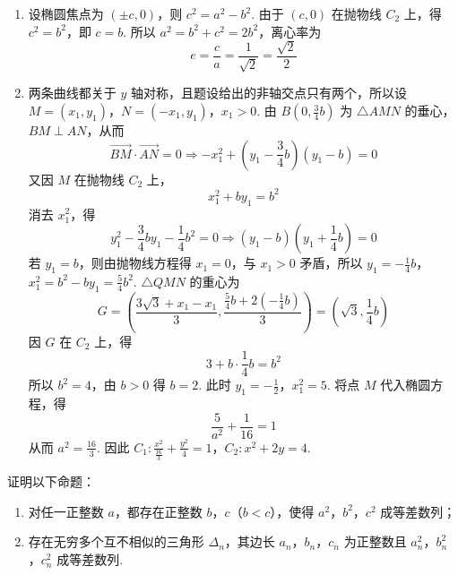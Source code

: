 \begin{solution}
\begin{enumerate}
\item 设椭圆焦点为 \((\pm c,0)\)，则 \(c^2=a^2-b^2\). 由于 \((c,0)\) 在抛物线 \(C_2\) 上，得 \(c^2=b^2\)，即 \(c=b\). 所以 \(a^2=b^2+c^2=2b^2\)，离心率为
\[
e=\frac ca=\frac1{\sqrt2}=\frac{\sqrt2}{2}
\]
\item 两条曲线都关于 \(y\) 轴对称，且题设给出的非轴交点只有两个，所以设
\(M=(x_1,y_1)\)，\(N=(-x_1,y_1)\)，\(x_1>0\).
由 \(B\!\left(0,\frac34b\right)\) 为 \(\triangle AMN\) 的垂心，\(BM\perp AN\)，从而
\[
\overrightarrow{BM}\cdot\overrightarrow{AN}=0
\Longrightarrow -x_1^2+\left(y_1-\frac34b\right)(y_1-b)=0
\]
又因 \(M\) 在抛物线 \(C_2\) 上，
\[
x_1^2+by_1=b^2
\]
消去 \(x_1^2\)，得
\[
y_1^2-\frac34by_1-\frac14b^2=0
\Longrightarrow (y_1-b)\left(y_1+\frac14b\right)=0
\]
若 \(y_1=b\)，则由抛物线方程得 \(x_1=0\)，与 \(x_1>0\) 矛盾，所以
\(y_1=-\frac14b\)，\(x_1^2=b^2-by_1=\frac54b^2\).
\(\triangle QMN\) 的重心为
\[
G=\left(\frac{3\sqrt3+x_1-x_1}{3},\frac{\frac54b+2\left(-\frac14b\right)}3\right)
=\left(\sqrt3,\frac14b\right)
\]
因 \(G\) 在 \(C_2\) 上，得
\[
3+b\cdot\frac14b=b^2
\]
所以 \(b^2=4\)，由 \(b>0\) 得 \(b=2\). 此时
\(y_1=-\frac12\)，\(x_1^2=5\).
将点 \(M\) 代入椭圆方程，得
\[
\frac5{a^2}+\frac{1}{16}=1
\]
从而 \(a^2=\frac{16}{3}\). 因此
\(C_1:\frac{x^2}{\frac{16}{3}}+\frac{y^2}{4}=1\)，\(C_2:x^2+2y=4\).
\end{enumerate}
\end{solution}

\begin{problem}
证明以下命题：

\begin{enumerate}
\item 对任一正整数 \(a\)，都存在正整数 \(b\)，\(c\)（\(b<c\)），使得 \(a^{2}\)，\(b^{2}\)，\(c^{2}\) 成等差数列；
\item 存在无穷多个互不相似的三角形 \(\Delta_{n}\)，其边长 \(a_{n}\)，\(b_{n}\)，\(c_{n}\) 为正整数且 \(a_{n}^{2}\)，\(b_{n}^{2}\)，\(c_{n}^{2}\) 成等差数列.
\end{enumerate}
\end{problem}

